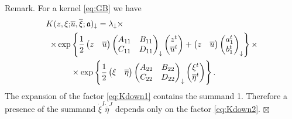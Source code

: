 \documentclass[]{amsart}
\def\fra{\mathfrak a}
\def\ov{\overline}
\def\sm{\smallskip}
\begin{document}
{\sc Remark.} For a kernel \eqref{eq:GB} we have
\begin{align}
K(z,\xi;&\ov u,\ov \xi;\fra)_\downarrow=\lambda_\downarrow\times
\notag
\\
\times
\exp&\left\{\frac12\begin{pmatrix}z&\ov u \end{pmatrix}
\begin{pmatrix}
A_{11}&B_{11}\\ C_{11}&D_{11}
\end{pmatrix}_\downarrow
\begin{pmatrix}z^t\\\ov u^t \end{pmatrix}+
\begin{pmatrix}z&\ov u \end{pmatrix}
\begin{pmatrix}a_1^t\\ b_1^t \end{pmatrix}_\downarrow
\right\}
\times 
\label{eq:Kdown1}
\\ 
&\times
\exp\left\{\frac12\begin{pmatrix}\xi&\ov \eta \end{pmatrix}
\begin{pmatrix}
A_{22}&B_{22}\\ C_{22}&D_{22}
\end{pmatrix}_\downarrow
\begin{pmatrix}\xi^t\\\ov \eta^t \end{pmatrix}
\right\}.
\label{eq:Kdown2}
\end{align}
The expansion of the  factor \eqref{eq:Kdown1}
contains the summand 1. Therefore
a presence of the summand $\dot \xi^I\dot {\ov\eta}^J$
depends only on the factor \eqref{eq:Kdown2}.
\hfill $\boxtimes$

\sm
\end{document}
